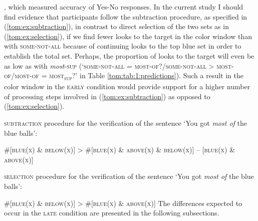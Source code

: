 \documentclass[output=paper]{langscibook}
\begin{document}
\citet{pietroski2009meaning,lidz2011interface,tomaszewicz2011verification,tomaszewicz2012semantics,tomaszewicz2013linguistic,hunter2017verification, Knowlton2021}, which measured accuracy of Yes-No responses. In the current study I should find
evidence that participants follow the subtraction procedure, as specified in (\ref{tom:ex:subtraction}), in contrast to direct selection of
the two sets as in (\ref{tom:ex:selection}), if we find fewer looks to the target in the color window than with \textsc{some-not-all}
because of continuing looks to the top blue set in order to establish the total set. Perhaps, the proportion of looks
to the target will even be as low as with \textit{most}\textsc{-sup}\textit{ }(`\textsc{some-not-all} = \textsc{most-of}?\slash \textsc{some-not-all} {\textgreater} \textsc{most-of}\slash \textsc{most-of} = \textsc{most\textsubscript{sup}}?' in Table \ref{tom:tab:1:predictions}). Such a result in the color window in the \textsc{early} condition would provide
support for a higher number of processing steps involved in (\ref{tom:ex:subtraction}) as opposed to (\ref{tom:ex:selection}). 


\ea \textsc{subtraction} procedure for the verification of the sentence `You got \textit{most of }the blue balls':

\#[\textsc{blue(x)} \& \textsc{below(x)}] {\textgreater} \#[\textsc{blue(x)} \& \textsc{above(x)} \& \textsc{below(x)}] – [\textsc{blue(x)} \& \textsc{above(x)}]\\
\label{tom:ex:subtraction}


\ex \textsc{selection} procedure for the verification of the sentence `You got \textit{most of }the blue balls':

\#[\textsc{blue(x)} \& \textsc{below(x)}] {\textgreater} \#[\textsc{blue(x)} \& \textsc{above(x)}]
\label{tom:ex:selection}
\z
The differences expected to occur in the \textsc{late} condition are presented in the following subsections.

  
\end{document}
